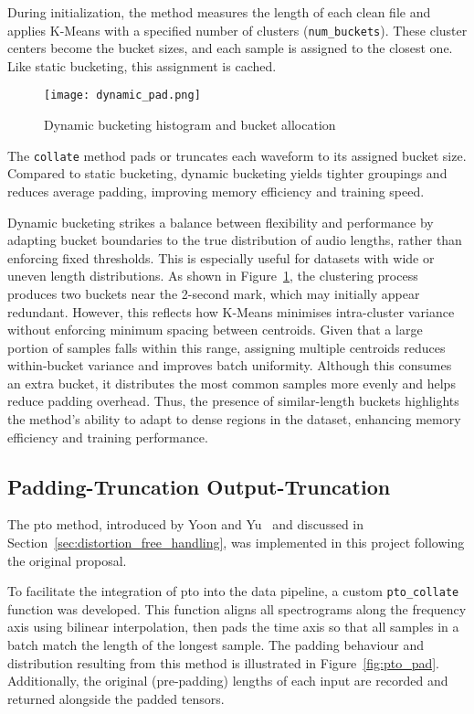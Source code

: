 During initialization, the method measures the length of each clean file and applies K-Means with a specified number of clusters (\texttt{num\_buckets}). These cluster centers become the bucket sizes, and each sample is assigned to the closest one. Like static bucketing, this assignment is cached.

\begin{figure}[H]
    \centering
    \texttt{[image: dynamic\_pad.png]}
    \caption{Dynamic bucketing histogram and bucket allocation}
    \label{fig:dynamic_pad}
\end{figure}

The \texttt{collate} method pads or truncates each waveform to its assigned bucket size. Compared to static bucketing, dynamic bucketing yields tighter groupings and reduces average padding, improving memory efficiency and training speed.

Dynamic bucketing strikes a balance between flexibility and performance by adapting bucket boundaries to the true distribution of audio lengths, rather than enforcing fixed thresholds. This is especially useful for datasets with wide or uneven length distributions. As shown in Figure~\ref{fig:dynamic_pad}, the clustering process produces two buckets near the 2-second mark, which may initially appear redundant. However, this reflects how K-Means minimises intra-cluster variance without enforcing minimum spacing between centroids. Given that a large portion of samples falls within this range, assigning multiple centroids reduces within-bucket variance and improves batch uniformity. Although this consumes an extra bucket, it distributes the most common samples more evenly and helps reduce padding overhead. Thus, the presence of similar-length buckets highlights the method’s ability to adapt to dense regions in the dataset, enhancing memory efficiency and training performance.

\subsection{Padding-Truncation Output-Truncation}
\label{subsec:pto_dataset}

The \gls{pto} method, introduced by Yoon and Yu~\cite{yoon2020pto} and discussed in Section~\ref{sec:distortion_free_handling}, was implemented in this project following the original proposal.

To facilitate the integration of \gls{pto} into the data pipeline, a custom \texttt{pto\_collate} function was developed. This function aligns all spectrograms along the frequency axis using bilinear interpolation, then pads the time axis so that all samples in a batch match the length of the longest sample. The padding behaviour and distribution resulting from this method is illustrated in Figure~\ref{fig:pto_pad}. Additionally, the original (pre-padding) lengths of each input are recorded and returned alongside the padded tensors.

